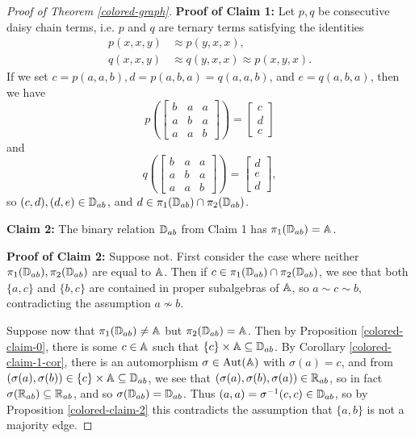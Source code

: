 \documentclass[letterpaper,11pt]{article}
\DeclareMathOperator{\Aut}{Aut}
\begin{document}
\begin{proof}[Proof of Theorem \ref{colored-graph}]
{\bf Proof of Claim 1:} Let $p,q$ be consecutive daisy chain terms, i.e. $p$ and $q$ are ternary terms satisfying the identities
\begin{align*}
p(x,x,y) &\approx p(y,x,x),\\
q(x,x,y) &\approx q(y,x,x) \approx p(x,y,x).
\end{align*}
If we set $c = p(a,a,b), d = p(a,b,a) = q(a,a,b)$, and $e = q(a,b,a)$, then we have
\[
p\left(\begin{bmatrix} b & a & a\\ a & b & a\\ a & a & b\end{bmatrix}\right) = \begin{bmatrix} c\\ d\\ c\end{bmatrix}
\]
and
\[
q\left(\begin{bmatrix} b & a & a\\ a & b & a\\ a & a & b\end{bmatrix}\right) = \begin{bmatrix} d\\ e\\ d\end{bmatrix},
\]
so $(c,d), (d,e) \in \mathbb{D}_{ab}$, and $d \in \pi_1(\mathbb{D}_{ab}) \cap \pi_2(\mathbb{D}_{ab})$.

{\bf Claim 2:} The binary relation $\mathbb{D}_{ab}$ from Claim 1 has $\pi_1(\mathbb{D}_{ab}) = \mathbb{A}$.

{\bf Proof of Claim 2:} Suppose not. First consider the case where neither $\pi_1(\mathbb{D}_{ab}), \pi_2(\mathbb{D}_{ab})$ are equal to $\mathbb{A}$. Then if $c \in \pi_1(\mathbb{D}_{ab}) \cap \pi_2(\mathbb{D}_{ab})$, we see that both $\{a,c\}$ and $\{b,c\}$ are contained in proper subalgebras of $\mathbb{A}$, so $a \sim c \sim b$, contradicting the assumption $a \not\sim b$.

Suppose now that $\pi_1(\mathbb{D}_{ab}) \ne \mathbb{A}$ but $\pi_2(\mathbb{D}_{ab}) = \mathbb{A}$. Then by Proposition \ref{colored-claim-0}, there is some $c \in \mathbb{A}$ such that $\{c\} \times \mathbb{A} \subseteq \mathbb{D}_{ab}$. By Corollary \ref{colored-claim-1-cor}, there is an automorphism $\sigma \in \Aut(\bA)$ with $\sigma(a) = c$, and from $(\sigma(a),\sigma(b)) \in \{c\}\times\mathbb{A} \subseteq \mathbb{D}_{ab}$, we see that $(\sigma(a),\sigma(b),\sigma(a)) \in \mathbb{R}_{ab}$, so in fact $\sigma(\mathbb{R}_{ab}) \subseteq \mathbb{R}_{ab}$, and so $\sigma(\mathbb{D}_{ab}) = \mathbb{D}_{ab}$. Thus $(a,a) = \sigma^{-1}(c,c) \in \mathbb{D}_{ab}$, so by Proposition \ref{colored-claim-2} this contradicts the assumption that $\{a,b\}$ is not a majority edge.


\end{proof}
\end{document}
